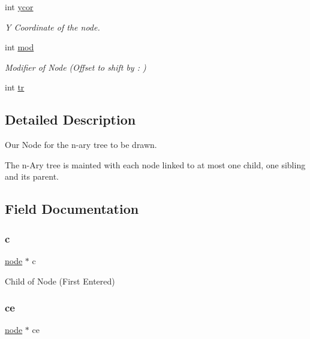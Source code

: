 \begin{DoxyCompactItemize}
int \hyperlink{structnode_ext_a593fcb9e99c813687d4a98bb74907995}{ycor}
\begin{DoxyCompactList}\small\item\em Y Coordinate of the node. \end{DoxyCompactList}\item 
int \hyperlink{structnode_ext_a9a72f3dcc6f4a19af79744c85a319f32}{mod}
\begin{DoxyCompactList}\small\item\em Modifier of Node (Offset to shift by \+: ) \end{DoxyCompactList}\item 
int \hyperlink{structnode_ext_aff41eaae2f593991bf076116299bd514}{tr}
\end{DoxyCompactItemize}


\subsection{Detailed Description}
Our Node for the n-\/ary tree to be drawn. 

The n-\/\+Ary tree is mainted with each node linked to at most one child, one sibling and it\textquotesingle{}s parent. 

\subsection{Field Documentation}
\hypertarget{structnode_ext_a44d30df24bbed2d24c5a7fd2987c871f}{}\label{structnode_ext_a44d30df24bbed2d24c5a7fd2987c871f} 
\subsubsection{\texorpdfstring{c}{c}}
{\footnotesize\ttfamily \hyperlink{binary_tree_w_s_8h_aafd781b4673cf2585cd9a156aebd08de}{node} $\ast$ c}



Child of Node (First Entered) 

\hypertarget{structnode_ext_a51e8c776c6bd5730032a988f3265fd7b}{}\label{structnode_ext_a51e8c776c6bd5730032a988f3265fd7b} 
\subsubsection{\texorpdfstring{ce}{ce}}
{\footnotesize\ttfamily \hyperlink{binary_tree_w_s_8h_aafd781b4673cf2585cd9a156aebd08de}{node} $\ast$ ce}

